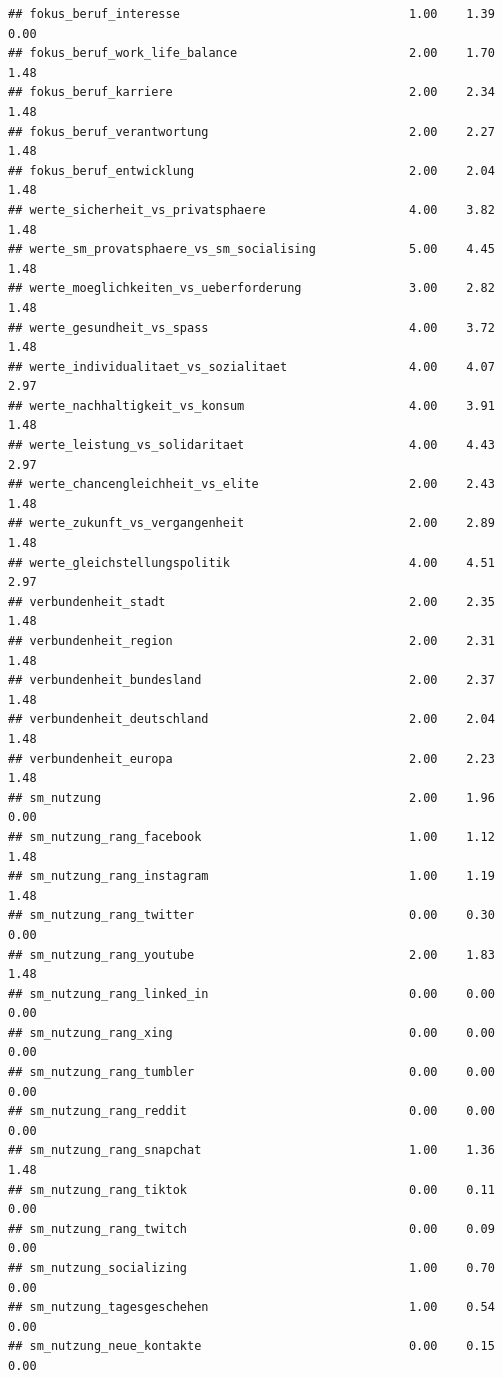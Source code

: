\documentclass[
]{book}
\begin{document}
\begin{verbatim}
## fokus_beruf_interesse                                1.00    1.39   0.00
## fokus_beruf_work_life_balance                        2.00    1.70   1.48
## fokus_beruf_karriere                                 2.00    2.34   1.48
## fokus_beruf_verantwortung                            2.00    2.27   1.48
## fokus_beruf_entwicklung                              2.00    2.04   1.48
## werte_sicherheit_vs_privatsphaere                    4.00    3.82   1.48
## werte_sm_provatsphaere_vs_sm_socialising             5.00    4.45   1.48
## werte_moeglichkeiten_vs_ueberforderung               3.00    2.82   1.48
## werte_gesundheit_vs_spass                            4.00    3.72   1.48
## werte_individualitaet_vs_sozialitaet                 4.00    4.07   2.97
## werte_nachhaltigkeit_vs_konsum                       4.00    3.91   1.48
## werte_leistung_vs_solidaritaet                       4.00    4.43   2.97
## werte_chancengleichheit_vs_elite                     2.00    2.43   1.48
## werte_zukunft_vs_vergangenheit                       2.00    2.89   1.48
## werte_gleichstellungspolitik                         4.00    4.51   2.97
## verbundenheit_stadt                                  2.00    2.35   1.48
## verbundenheit_region                                 2.00    2.31   1.48
## verbundenheit_bundesland                             2.00    2.37   1.48
## verbundenheit_deutschland                            2.00    2.04   1.48
## verbundenheit_europa                                 2.00    2.23   1.48
## sm_nutzung                                           2.00    1.96   0.00
## sm_nutzung_rang_facebook                             1.00    1.12   1.48
## sm_nutzung_rang_instagram                            1.00    1.19   1.48
## sm_nutzung_rang_twitter                              0.00    0.30   0.00
## sm_nutzung_rang_youtube                              2.00    1.83   1.48
## sm_nutzung_rang_linked_in                            0.00    0.00   0.00
## sm_nutzung_rang_xing                                 0.00    0.00   0.00
## sm_nutzung_rang_tumbler                              0.00    0.00   0.00
## sm_nutzung_rang_reddit                               0.00    0.00   0.00
## sm_nutzung_rang_snapchat                             1.00    1.36   1.48
## sm_nutzung_rang_tiktok                               0.00    0.11   0.00
## sm_nutzung_rang_twitch                               0.00    0.09   0.00
## sm_nutzung_socializing                               1.00    0.70   0.00
## sm_nutzung_tagesgeschehen                            1.00    0.54   0.00
## sm_nutzung_neue_kontakte                             0.00    0.15   0.00

\end{verbatim}
\end{document}
